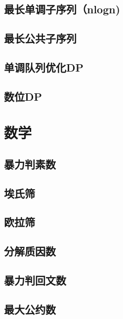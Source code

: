 \section{最长单调子序列（nlogn)}
\raggedbottom
\hrulefill
\section{最长公共子序列}
\raggedbottom
\hrulefill
\section{单调队列优化DP}
\raggedbottom
\hrulefill
\section{数位DP}
\raggedbottom
\hrulefill

\chapter{数学}
\section{暴力判素数}
\raggedbottom
\hrulefill
\section{埃氏筛}
\raggedbottom
\hrulefill
\section{欧拉筛}
\raggedbottom
\hrulefill
\section{分解质因数}
\raggedbottom
\hrulefill
\section{暴力判回文数}
\raggedbottom
\hrulefill
\section{最大公约数}
\raggedbottom
\hrulefill
